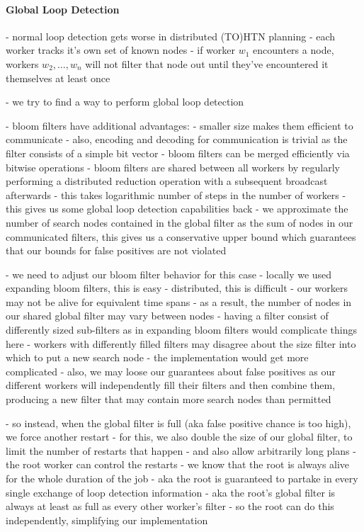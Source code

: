 \paragraph{Global Loop Detection}
- normal loop detection gets worse in distributed (TO)HTN planning
- each worker tracks it's own set of known nodes
- if worker $w_1$ encounters a node, workers $w_2, \ldots, w_n$ will not filter that node out until they've encountered it themselves at least once

- we try to find a way to perform global loop detection

- bloom filters have additional advantages:
	- smaller size makes them efficient to communicate
	- also, encoding and decoding for communication is trivial as the filter consists of a simple bit vector
	- bloom filters can be merged efficiently via bitwise operations
- bloom filters are shared between all workers by regularly performing a distributed reduction operation with a subsequent broadcast afterwards
- this takes logarithmic number of steps in the number of workers
- this gives us some global loop detection capabilities back
- we approximate the number of search nodes contained in the global filter as the sum of nodes in our communicated filters, this gives us a conservative upper bound which guarantees that our bounds for false positives are not violated

- we need to adjust our bloom filter behavior for this case
- locally we used expanding bloom filters, this is easy
- distributed, this is difficult
	- our workers may not be alive for equivalent time spans
	- as a result, the number of nodes in our shared global filter may vary between nodes
	- having a filter consist of differently sized sub-filters as in expanding bloom filters would complicate things here
	- workers with differently filled filters may disagree about the size filter into which to put a new search node
	- the implementation would get more complicated
	- also, we may loose our guarantees about false positives as our different workers will independently fill their filters and then combine them, producing a new filter that may contain more search nodes than permitted
	
	- so instead, when the global filter is full (aka false positive chance is too high), we force another restart
	- for this, we also double the size of our global filter, to limit the number of restarts that happen
	- and also allow arbitrarily long plans
- the root worker can control the restarts
- we know that the root is always alive for the whole duration of the job
- aka the root is guaranteed to partake in every single exchange of loop detection information
- aka the root's global filter is always at least as full as every other worker's filter
- so the root can do this independently, simplifying our implementation

